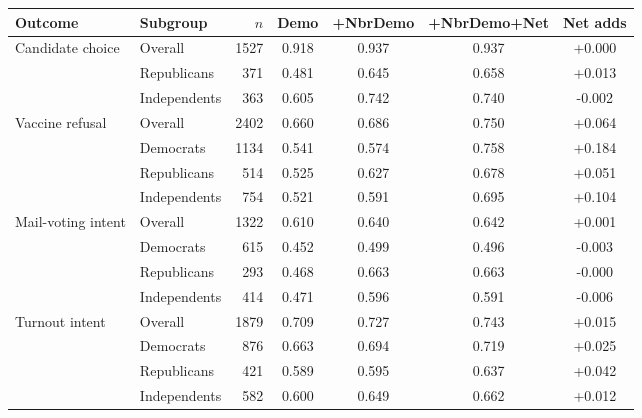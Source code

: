 \begin{tabular}{llrcccc}
\toprule
Outcome & Subgroup & $n$ & Demo & +NbrDemo & +NbrDemo+Net & Net adds \\
\midrule
Candidate choice & Overall & 1527 & 0.918 & 0.937 & 0.937 & +0.000 \\
 & Republicans & 371 & 0.481 & 0.645 & 0.658 & +0.013 \\
 & Independents & 363 & 0.605 & 0.742 & 0.740 & -0.002 \\
Vaccine refusal & Overall & 2402 & 0.660 & 0.686 & 0.750 & +0.064 \\
 & Democrats & 1134 & 0.541 & 0.574 & 0.758 & +0.184 \\
 & Republicans & 514 & 0.525 & 0.627 & 0.678 & +0.051 \\
 & Independents & 754 & 0.521 & 0.591 & 0.695 & +0.104 \\
Mail-voting intent & Overall & 1322 & 0.610 & 0.640 & 0.642 & +0.001 \\
 & Democrats & 615 & 0.452 & 0.499 & 0.496 & -0.003 \\
 & Republicans & 293 & 0.468 & 0.663 & 0.663 & -0.000 \\
 & Independents & 414 & 0.471 & 0.596 & 0.591 & -0.006 \\
Turnout intent & Overall & 1879 & 0.709 & 0.727 & 0.743 & +0.015 \\
 & Democrats & 876 & 0.663 & 0.694 & 0.719 & +0.025 \\
 & Republicans & 421 & 0.589 & 0.595 & 0.637 & +0.042 \\
 & Independents & 582 & 0.600 & 0.649 & 0.662 & +0.012 \\
\bottomrule
\end{tabular}